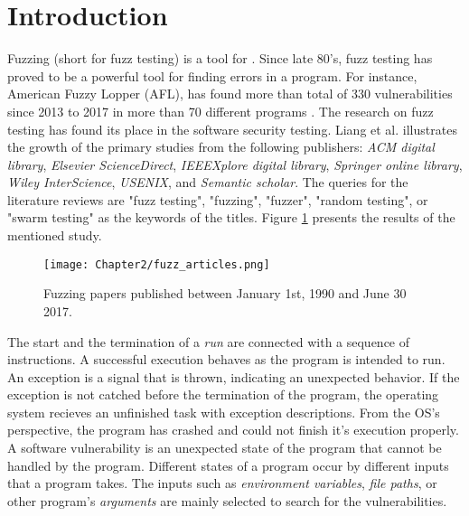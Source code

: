 \section{Introduction} \label{sec:2.1}




Fuzzing (short for fuzz testing) is a tool for . Since late 80's, fuzz testing has proved to be a powerful tool for finding errors in a program. For instance, American Fuzzy Lopper (AFL), has found more than total of 330 vulnerabilities since 2013 to 2017 in more than 70 different programs \cite{afl_cve}. The research on fuzz testing has found its place in the software security testing. Liang et al. \cite{liang2018fuzzing} illustrates the growth of the primary studies from the following publishers: \textit{ACM digital library}, \textit{Elsevier ScienceDirect}, \textit{IEEEXplore digital library}, \textit{Springer online library}, \textit{Wiley InterScience}, \textit{USENIX}, and \textit{Semantic scholar}. The queries for the literature reviews are "fuzz testing", "fuzzing", "fuzzer", "random testing", or "swarm testing" as the keywords of the titles. Figure \ref{fig:fuzz_articles} presents the results of the mentioned study.

\begin{figure}[!t]
    \texttt{[image: Chapter2/fuzz\_articles.png]}
    \centering
    \caption{Fuzzing papers published between January 1st, 1990 and June 30 2017. \cite{liang2018fuzzing}}
    \label{fig:fuzz_articles}
\end{figure}

The start and the termination of a \textit{run} are connected with a sequence of instructions. A successful execution behaves as the program is intended to run. An exception is a signal that is thrown, indicating an unexpected behavior. If the exception is not catched before the termination of the program, the operating system recieves an unfinished task with exception descriptions. From the OS's perspective, the program has crashed and could not finish it's execution properly. A software vulnerability is an unexpected state of the program that cannot be handled by the program. Different states of a program occur by different inputs that a program takes. The inputs such as \textit{environment variables}, \textit{file paths}, or other program's \textit{arguments} are mainly selected to search for the vulnerabilities. 

